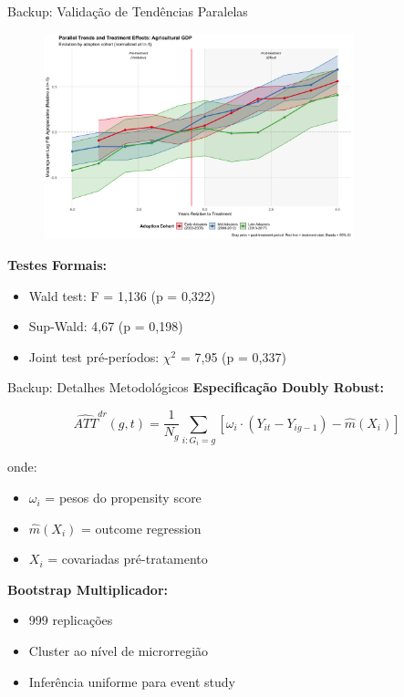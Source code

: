 \documentclass[10pt,aspectratio=169]{beamer}
\begin{document}
\begin{frame}{Backup: Validação de Tendências Paralelas}
\begin{figure}
\centering
\includegraphics[width=0.8\textwidth]{../../../data/outputs/parallel_trends_complete_pib_agro_normalized.png}
\end{figure}

\textbf{Testes Formais:}
\begin{itemize}
    \item Wald test: F = 1,136 (p = 0,322)
    \item Sup-Wald: 4,67 (p = 0,198)
    \item Joint test pré-períodos: $\chi^2$ = 7,95 (p = 0,337)
\end{itemize}
\end{frame}

\begin{frame}{Backup: Detalhes Metodológicos}
\textbf{Especificação Doubly Robust:}

\begin{equation}
\widehat{ATT}^{dr}(g,t) = \frac{1}{N_g} \sum_{i:G_i=g} \left[ \omega_i \cdot (Y_{it} - Y_{ig-1}) - \hat{m}(X_i) \right]
\end{equation}

onde:
\begin{itemize}
    \item $\omega_i$ = pesos do propensity score
    \item $\hat{m}(X_i)$ = outcome regression
    \item $X_i$ = covariadas pré-tratamento
\end{itemize}

\textbf{Bootstrap Multiplicador:}
\begin{itemize}
    \item 999 replicações
    \item Cluster ao nível de microrregião
    \item Inferência uniforme para event study
\end{itemize}
\end{frame}
\end{document}
